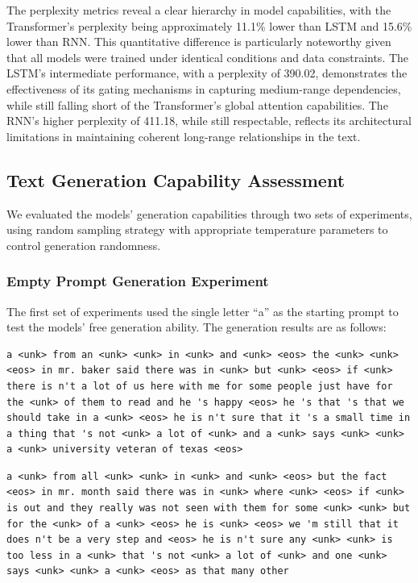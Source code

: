 \documentclass[12pt,oneside]{article}
\begin{document}
The perplexity metrics reveal a clear hierarchy in model capabilities, with the Transformer's perplexity being approximately 11.1\% lower than LSTM and 15.6\% lower than RNN. This quantitative difference is particularly noteworthy given that all models were trained under identical conditions and data constraints. The LSTM's intermediate performance, with a perplexity of 390.02, demonstrates the effectiveness of its gating mechanisms in capturing medium-range dependencies, while still falling short of the Transformer's global attention capabilities. The RNN's higher perplexity of 411.18, while still respectable, reflects its architectural limitations in maintaining coherent long-range relationships in the text.

\FloatBarrier  %

\subsection{Text Generation Capability Assessment}

We evaluated the models' generation capabilities through two sets of experiments, using random sampling strategy with appropriate temperature parameters to control generation randomness.

\subsubsection{Empty Prompt Generation Experiment}

The first set of experiments used the single letter ``a'' as the starting prompt to test the models' free generation ability. The generation results are as follows:

\begin{lstlisting}[caption=Transformer Model Generation]
a <unk> from an <unk> <unk> in <unk> and <unk> <eos> the <unk> <unk> <eos> in mr. baker said there was in <unk> but <unk> <eos> if <unk> there is n't a lot of us here with me for some people just have for the <unk> of them to read and he 's happy <eos> he 's that 's that we should take in a <unk> <eos> he is n't sure that it 's a small time in a thing that 's not <unk> a lot of <unk> and a <unk> says <unk> <unk> a <unk> university veteran of texas <eos>
\end{lstlisting}

\begin{lstlisting}[caption=LSTM Model Generation]
a <unk> from all <unk> <unk> in <unk> and <unk> <eos> but the fact <eos> in mr. month said there was in <unk> where <unk> <eos> if <unk> is out and they really was not seen with them for some <unk> <unk> but for the <unk> of a <unk> <eos> he is <unk> <eos> we 'm still that it does n't be a very step and <eos> he is n't sure any <unk> <unk> is too less in a <unk> that 's not <unk> a lot of <unk> and one <unk> says <unk> <unk> a <unk> <eos> as that many other
\end{lstlisting}
\end{document}
